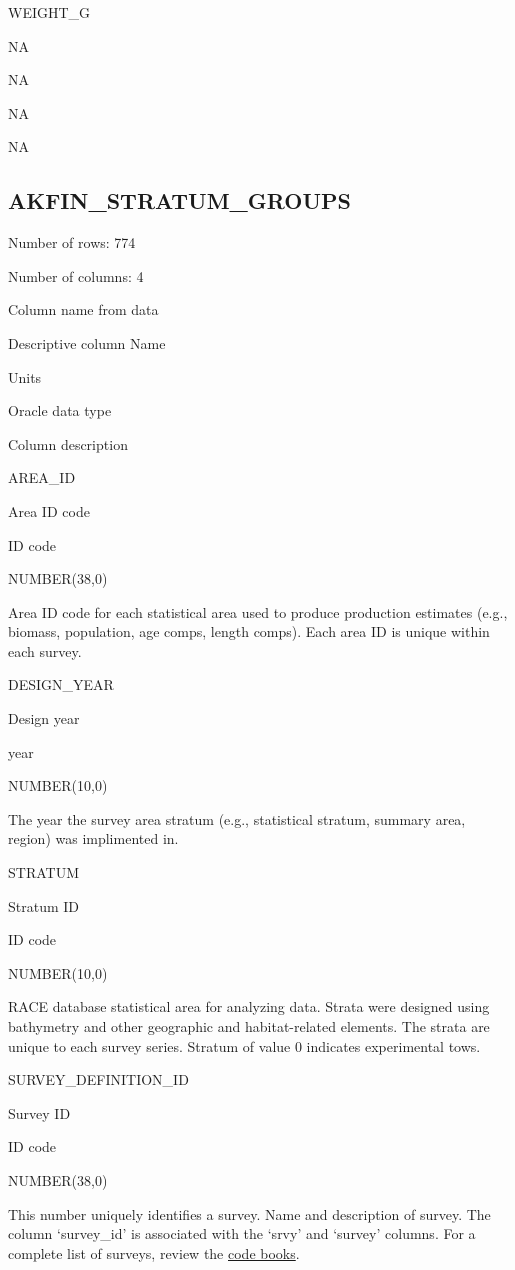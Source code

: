 \documentclass[
  letterpaper,
  oneside,
  open=any]{scrbook}
\begin{document}
WEIGHT\_G

NA

NA

NA

NA

\hypertarget{akfin_stratum_groups}{%
\subsection{AKFIN\_STRATUM\_GROUPS}\label{akfin_stratum_groups}}

Number of rows: 774

Number of columns: 4

Column name from data

Descriptive column Name

Units

Oracle data type

Column description

AREA\_ID

Area ID code

ID code

NUMBER(38,0)

Area ID code for each statistical area used to produce production
estimates (e.g., biomass, population, age comps, length comps). Each
area ID is unique within each survey.

DESIGN\_YEAR

Design year

year

NUMBER(10,0)

The year the survey area stratum (e.g., statistical stratum, summary
area, region) was implimented in.

STRATUM

Stratum ID

ID code

NUMBER(10,0)

RACE database statistical area for analyzing data. Strata were designed
using bathymetry and other geographic and habitat-related elements. The
strata are unique to each survey series. Stratum of value 0 indicates
experimental tows.

SURVEY\_DEFINITION\_ID

Survey ID

ID code

NUMBER(38,0)

This number uniquely identifies a survey. Name and description of
survey. The column `survey\_id' is associated with the `srvy' and
`survey' columns. For a complete list of surveys, review the
\href{https://www.fisheries.noaa.gov/resource/document/groundfish-survey-species-code-manual-and-data-codes-manual}{code
books}.
\end{document}
